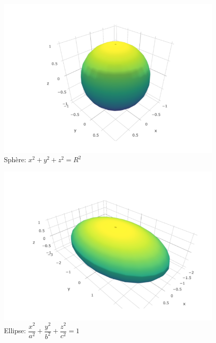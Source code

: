 \documentclass[]{book}
\theoremstyle{definition}
\theoremstyle{definition}
\theoremstyle{definition}
\theoremstyle{remark}
\begin{document}
\begin{figure}

{\centering \includegraphics[width=0.8\linewidth]{resources/images/sphere} 

}

\caption{Sphère: $x^2+y^2+z^2=R^2$}\label{fig:sphere}
\end{figure}

\begin{figure}

{\centering \includegraphics[width=0.8\linewidth]{resources/images/ellipse} 

}

\caption{Ellipse: $\dfrac{x^2}{a^2}+\dfrac{y^2}{b^2}+\dfrac{z^2}{c^2}=1$}\label{fig:ellipse}
\end{figure}
\end{document}
